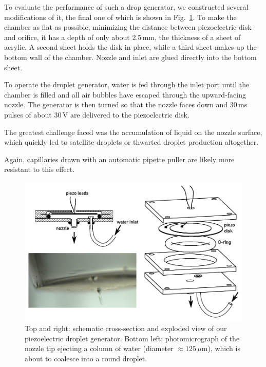 \documentclass[11.5pt]{book}
\newcommand*{\figref}[1]{Fig.~\ref{#1}}
\begin{document}
To evaluate the performance of such a drop generator, we constructed several
modifications of it, the final one of which is shown in \figref{fig:flatyang}.
To make the chamber as flat as possible, minimizing the distance between
piezoelectric disk and orifice, it has a depth of only about 2.5$\,$mm, the
thickness of a sheet of acrylic. A second sheet holds the disk in place, while a
third sheet makes up the bottom wall of the chamber. Nozzle and inlet are glued
directly into the bottom sheet.

To operate the droplet generator, water is fed through
the inlet port until the chamber is filled and all air bubbles have escaped
through the upward-facing nozzle. The generator is then turned so that the nozzle
faces down and $30\,$ms pulses of about $30\,$V are delivered to the
piezoelectric disk.

The greatest challenge faced was the accumulation of liquid on the nozzle
surface, which quickly led to satellite droplets or thwarted droplet production
altogether.  %

Again, capillaries drawn with an automatic pipette puller are likely
more resistant to this effect.

\begin{figure}
\centering
\includegraphics[width=\textwidth]{img/setup/flatyang_exploded.pdf}
\caption{Top and right: schematic cross-section and exploded view of our
    piezoelectric droplet generator. Bottom left: photomicrograph of the nozzle
    tip ejecting a column of water (diameter $\approx 125\,\mu$m), which is about to coalesce into a
round droplet. \label{fig:flatyang}}
\end{figure}
\end{document}
